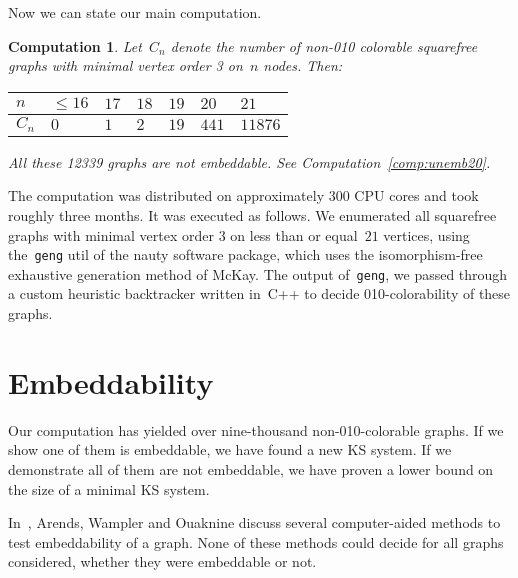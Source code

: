 \documentclass[adraft,copyright,creativecommons]{eptcs}
\newcounter{main}
\newtheorem{comp}[main]{Computation}
\theoremstyle{definition}
\theoremstyle{remark}
\begin{document}
Now we can state our main computation.
\begin{comp}
    Let~$C_n$ denote the number of non-010 colorable squarefree
    graphs with minimal vertex order 3 on~$n$ nodes.  Then:

    \begin{center}
    \begin{tabular}{l|llllll}
        $n$ & $\leq 16$
            & $17$
            & $18$
            & $19$
            & $20$
            & $21$ \\
        \hline
        $C_n$ & $0$
            & $1$
            & $2$
            & $19$
            & $441$
            & $11876$
    \end{tabular}
    \end{center}

    All these 12339 graphs are not embeddable.
    See Computation~\ref{comp:unemb20}.
\end{comp}
The computation was distributed on approximately 300 CPU cores
and took roughly three months.
It was executed as follows.
We enumerated all squarefree graphs with minimal vertex
order 3 on less than or equal~$21$ vertices,
using the~\texttt{geng} util of the nauty software package,
which uses the isomorphism-free exhaustive generation
method of McKay\cite{geng}.
The output of~\texttt{geng}, we passed through
a custom heuristic backtracker written in~C++
to decide 010-colorability of these graphs.

\section{Embeddability}\label{sec:emb}
Our computation has yielded over nine-thousand non-010-colorable graphs.
If we show one of them is embeddable, we have found a new KS system.
If we demonstrate all of them are not embeddable, we have
proven a lower bound on the size of a minimal KS system.

In~\cite{aow11}, Arends, Wampler and Ouaknine discuss several
computer-aided methods
to test embeddability of a graph.  None of these methods could decide
for all graphs considered, whether they were embeddable or not.
\end{document}
